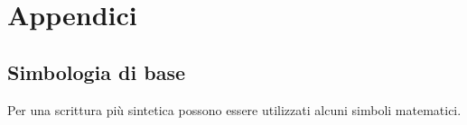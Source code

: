\documentclass[
  11pt,
]{krantz}
\theoremstyle{definition}
\theoremstyle{definition}
\theoremstyle{definition}
\theoremstyle{definition}
\theoremstyle{remark}
\begin{document}
\mainmatter

\hypertarget{part-appendici}{%
\part{Appendici}\label{part-appendici}}

\hypertarget{appendix-appendici}{%
\appendix {}}


\hypertarget{simbologia-di-base}{%
\chapter{Simbologia di base}\label{simbologia-di-base}}

Per una scrittura più sintetica possono essere utilizzati alcuni simboli matematici.
\end{document}
